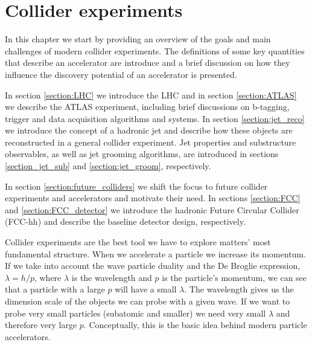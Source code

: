 
\chapter{Collider experiments}
\label{chapter:exp}

In this chapter we start by providing an overview of the goals and main challenges of modern collider experiments. The definitions of some key quantities that describe an accelerator are introduce and a brief discussion on how they influence the discovery potential of an accelerator is presented. 

In section \ref{section:LHC} we introduce the LHC and in section \ref{section:ATLAS} we describe the ATLAS experiment, including brief discussions on b-tagging, trigger and data acquisition algorithms and systems. In section \ref{section:jet_reco} we introduce the concept of a hadronic jet and describe how these objects are reconstructed in a general collider experiment. Jet properties and substructure observables, as well as jet grooming algorithms, are introduced in sections \ref{section_jet_sub} and \ref{section:jet_groom}, respectively. 

In section \ref{section:future_colliders} we shift the focus to future collider experiments and accelerators and motivate their need. In sections \ref{section:FCC} and \ref{section:FCC_detector} we introduce the hadronic Future Circular Collider (FCC-hh) and describe the baseline detector design, respectively.

Collider experiments are the best tool we have to explore matters' most fundamental structure. 
When we accelerate a particle we increase its momentum. If we take into account the wave particle duality and the De Broglie expression, $\lambda=h/p$, where $\lambda$ is the wavelength and $p$ is the particle's momentum, we can see that a particle with a large $p$ will have a small $\lambda$. The wavelength gives us the dimension scale of the objects we can probe with a given wave. If we want to probe very small particles (subatomic and smaller) we need very small $\lambda$ and therefore very large $p$. Conceptually, this is the basic idea behind modern particle accelerators. 


